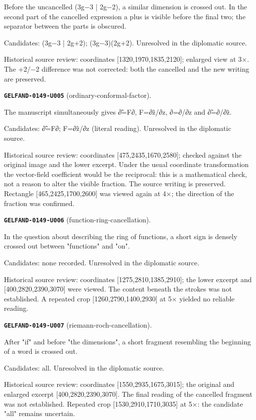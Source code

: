 \documentclass[11pt]{article}
\theoremstyle{definition}
\theoremstyle{remark}
\begin{document}
Before the uncancelled (3g−3 | 2g−2), a similar dimension is crossed out. In the second part of the cancelled expression a plus is visible before the final two; the separator between the parts is obscured.\par
Candidates: (3g−3 | 2g+2); (3g−3)(2g+2). Unresolved in the diplomatic source.\par
Historical source review: coordinates [1320,1970,1835,2120]; enlarged view at 3×. The +2/−2 difference was not corrected: both the cancelled and the new writing are preserved.\par\medskip
\noindent\leavevmode{}\label{GELFAND-P001369:ordinary-conformal-factor:note}\textbf{\texttt{GELFAND-0149-U005}} (ordinary-conformal-factor).\par\nopagebreak[4]
The manuscript simultaneously gives ∂̃=F∂, F=∂z̃/∂z, ∂=∂/∂z and ∂̃=∂/∂z̃.\par
Candidates: ∂̃=F∂; F=∂z̃/∂z (literal reading). Unresolved in the diplomatic source.\par
Historical source review: coordinates [475,2435,1670,2580]; checked against the original image and the lower excerpt. Under the usual coordinate transformation the vector-field coefficient would be the reciprocal: this is a mathematical check, not a reason to alter the visible fraction. The source writing is preserved. Rectangle [465,2425,1700,2600] was viewed again at 4×; the direction of the fraction was confirmed.\par\medskip
\noindent\leavevmode{}\label{GELFAND-P001369:function-ring-cancellation:note}\textbf{\texttt{GELFAND-0149-U006}} (function-ring-cancellation).\par\nopagebreak[4]
In the question about describing the ring of functions, a short sign is densely crossed out between "functions" and "on".\par
Candidates: none recorded. Unresolved in the diplomatic source.\par
Historical source review: coordinates [1275,2810,1385,2910]; the lower excerpt and [400,2820,2390,3070] were viewed. The content beneath the strokes was not established. A repeated crop [1260,2790,1400,2930] at 5× yielded no reliable reading.\par\medskip
\noindent\leavevmode{}\label{GELFAND-P001369:riemann-roch-cancellation:note}\textbf{\texttt{GELFAND-0149-U007}} (riemann-roch-cancellation).\par\nopagebreak[4]
After "if" and before "the dimensions", a short fragment resembling the beginning of a word is crossed out.\par
Candidates: all. Unresolved in the diplomatic source.\par
Historical source review: coordinates [1550,2935,1675,3015]; the original and enlarged excerpt [400,2820,2390,3070]. The final reading of the cancelled fragment was not established. Repeated crop [1530,2910,1710,3035] at 5×: the candidate "all" remains uncertain.\par\medskip
\end{document}
